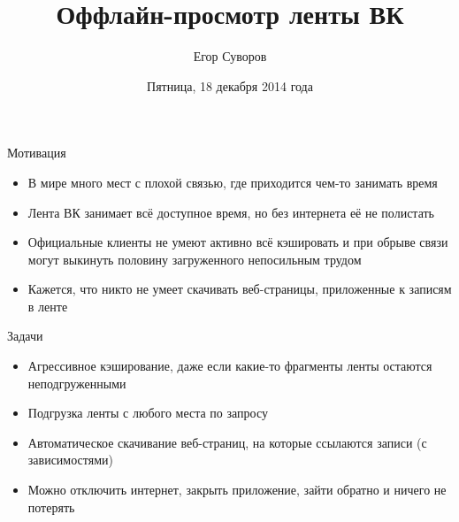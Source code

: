 \documentclass[utf8,xcolor=table]{beamer}
\title{Оффлайн-просмотр ленты ВК}
\author{Егор Суворов}
\institute[СПб АУ]{Практика, весна 2014\\Какой такой куратор?}
\date[18.12.2014]{Пятница, 18 декабря 2014 года}
\begin{document}
\begin{frame}
\titlepage
\end{frame}

\begin{frame}[t]{Мотивация}
	\begin{itemize}
		\item В мире много мест с плохой связью, где приходится чем-то занимать время
		\item Лента ВК занимает всё доступное время, но без интернета её не полистать
		\item Официальные клиенты не умеют активно всё кэшировать и при обрыве связи могут выкинуть половину загруженного непосильным трудом
		\item Кажется, что никто не умеет скачивать веб-страницы, приложенные к записям в ленте
	\end{itemize}
\end{frame}

\begin{frame}[t]{Задачи}
	\begin{itemize}
		\item Агрессивное кэширование, даже если какие-то фрагменты ленты остаются неподгруженными
		\item Подгрузка ленты с любого места по запросу
		\item Автоматическое скачивание веб-страниц, на которые ссылаются записи (с зависимостями)
		\item Можно отключить интернет, закрыть приложение, зайти обратно и ничего не потерять
	\end{itemize}
\end{frame}
\end{document}
